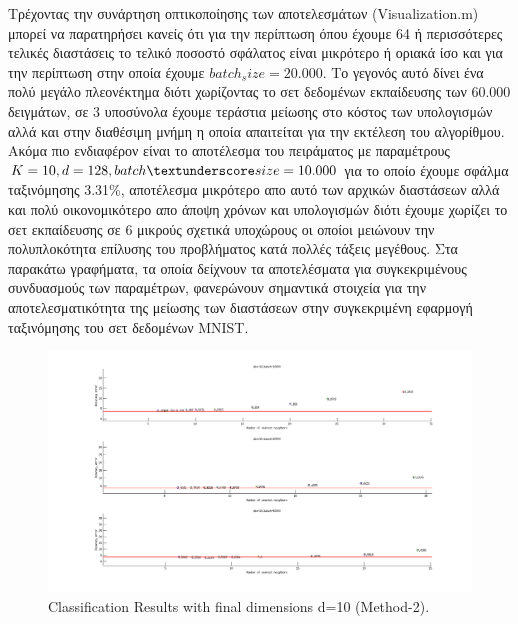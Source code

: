 Τρέχοντας την συνάρτηση οπτικοποίησης των αποτελεσμάτων (\textlatin{Visualization.m}) μπορεί να παρατηρήσει κανείς ότι για την περίπτωση όπου έχουμε 64 ή περισσότερες τελικές διαστάσεις το τελικό ποσοστό σφάλατος είναι μικρότερο ή οριακά ίσο και για την περίπτωση στην οποία έχουμε $batch_size=20.000$. Το γεγονός αυτό δίνει ένα πολύ μεγάλο πλεονέκτημα διότι χωρίζοντας το σετ δεδομένων εκπαίδευσης των 60.000 δειγμάτων, σε 3 υποσύνολα έχουμε τεράστια μείωσης στο κόστος των υπολογισμών αλλά και στην διαθέσιμη μνήμη η οποία απαιτείται για την εκτέλεση του αλγορίθμου. Ακόμα πιο ενδιαφέρον είναι το αποτέλεσμα του πειράματος με παραμέτρους $K=10, d=128, batch\textunderscore size=10.000$ για το οποίο έχουμε σφάλμα ταξινόμησης 3.31\%, αποτέλεσμα μικρότερο απο αυτό των αρχικών διαστάσεων αλλά και πολύ οικονομικότερο απο άποψη χρόνων και υπολογισμών διότι έχουμε χωρίζει το σετ εκπαίδευσης σε 6 μικρούς σχετικά υποχώρους οι οποίοι μειώνουν την πολυπλοκότητα επίλυσης του προβλήματος κατά πολλές τάξεις μεγέθους. Στα παρακάτω γραφήματα, τα οποία δείχνουν τα αποτελέσματα για συγκεκριμένους συνδυασμούς των παραμέτρων, φανερώνουν σημαντικά στοιχεία για την αποτελεσματικότητα της μείωσης των διαστάσεων στην συγκεκριμένη εφαρμογή ταξινόμησης του σετ δεδομένων \textlatin{MNIST}.
\newpage
\begin{figure}[t!]
\centering
\includegraphics[width=\textwidth]{figs/8.png}
\newline
\caption{ \textlatin{Classification Results with final dimensions d=10 (Method-2)}.} 
\end{figure}


